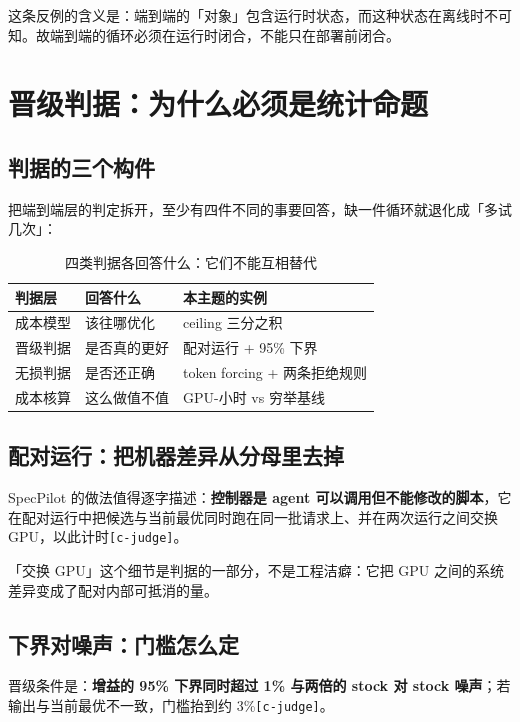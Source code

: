 这条反例的含义是：端到端的「对象」包含运行时状态，而这种状态在离线时不可知。故端到端的循环必须在运行时闭合，不能只在部署前闭合。


\section{晋级判据：为什么必须是统计命题}

\subsection{判据的三个构件}

把端到端层的判定拆开，至少有四件不同的事要回答，缺一件循环就退化成「多试几次」：


\begin{table}[t]
\centering
\footnotesize
\setlength{\tabcolsep}{4pt}
\caption{四类判据各回答什么：它们不能互相替代}
\label{tab:2}
\begin{tabular}{lll}
\toprule
判据层 & 回答什么 & 本主题的实例 \\
\midrule
成本模型 & 该往哪优化 & ceiling 三分之积 \\
晋级判据 & 是否真的更好 & 配对运行 + 95\% 下界 \\
无损判据 & 是否还正确 & token forcing + 两条拒绝规则 \\
成本核算 & 这么做值不值 & GPU-小时 vs 穷举基线 \\
\bottomrule
\end{tabular}
\end{table}

\subsection{配对运行：把机器差异从分母里去掉}

SpecPilot 的做法值得逐字描述：\textbf{控制器是 agent 可以调用但不能修改的脚本}，它在配对运行中把候选与当前最优同时跑在同一批请求上、并在两次运行之间交换 GPU，以此计时{\scriptsize\texttt{[c-\hspace{0pt}judge]}}。


「交换 GPU」这个细节是判据的一部分，不是工程洁癖：它把 GPU 之间的系统差异变成了配对内部可抵消的量。


\subsection{下界对噪声：门槛怎么定}

晋级条件是：\textbf{增益的 95\% 下界同时超过 1\% 与两倍的 stock 对 stock 噪声}；若输出与当前最优不一致，门槛抬到约 3\%{\scriptsize\texttt{[c-\hspace{0pt}judge]}}。


